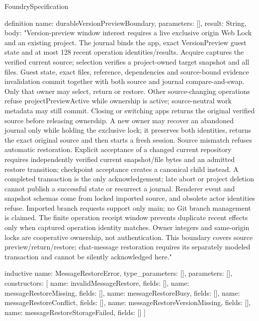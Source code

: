 \begin{lexlean}{FoundrySpecification}
\begin{semanticmodule}
definition{
  name: durableVersionPreviewBoundary,
  parameters: [],
  result: String,
  body: "Version-preview window interest requires a live exclusive origin Web Lock and an existing project. The journal binds the app, exact VersionPreview guest state and at most 128 recent operation identities/results. Acquire captures the verified current source; selection verifies a project-owned target snapshot and all files. Guest state, exact files, reference, dependencies and source-bound evidence invalidation commit together with both source and journal compare-and-swap. Only that owner may select, return or restore. Other source-changing operations refuse projectPreviewActive while ownership is active; source-neutral work metadata may still commit. Closing or switching apps returns the original verified source before releasing ownership. A new owner may recover an abandoned journal only while holding the exclusive lock; it preserves both identities, returns the exact original source and then starts a fresh session. Source mismatch refuses automatic restoration. Explicit acceptance of a changed current repository requires independently verified current snapshot/file bytes and an admitted restore transition; checkpoint acceptance creates a canonical child instead. A completed transaction is the only acknowledgement; late abort or project deletion cannot publish a successful state or resurrect a journal. Renderer event and snapshot schemas come from locked imported source, and obsolete actor identities refuse. Imported branch requests support only main; no Git branch management is claimed. The finite operation receipt window prevents duplicate recent effects only when captured operation identity matches. Owner integers and same-origin locks are cooperative ownership, not authentication. This boundary covers source preview/return/restore; chat-message restoration requires its separately modeled transaction and cannot be silently acknowledged here."
}

inductive{
  name: MessageRestoreError,
  type_parameters: [],
  parameters: [],
  constructors: [
    {name: invalidMessageRestore, fields: []},
    {name: messageRestoreMissing, fields: []},
    {name: messageRestoreBusy, fields: []},
    {name: messageRestoreConflict, fields: []},
    {name: messageRestoreVersionMissing, fields: []},
    {name: messageRestoreStorageFailed, fields: []}
  ]
}


\end{semanticmodule}
\end{lexlean}
